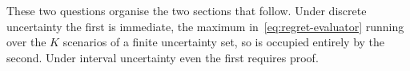 These two questions organise the two sections that follow.
Under discrete uncertainty the first is immediate, the maximum in~\eqref{eq:regret-evaluator} running over the $K$ scenarios of a finite uncertainty set, so  is occupied entirely by the second.
Under interval uncertainty even the first requires proof.

%
%
%
%
%
